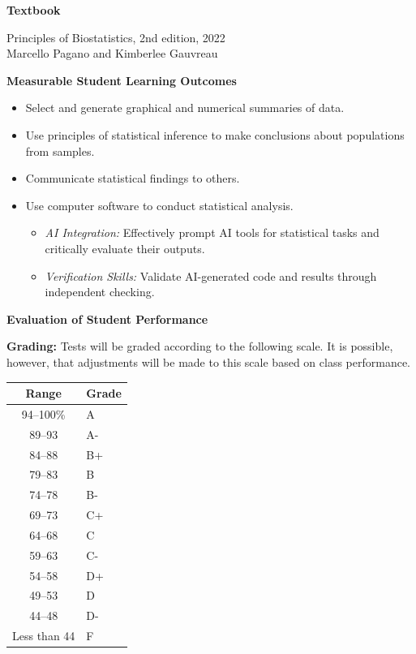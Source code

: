 \documentclass[11pt]{article}
\begin{document}
\vspace{8pt}

\newpage

\noindent\textbf{Textbook}

\noindent Principles of Biostatistics, 2nd edition, 2022\\
Marcello Pagano and Kimberlee Gauvreau

\vspace{8pt}

\noindent\textbf{Measurable Student Learning Outcomes}

\begin{itemize}[leftmargin=20pt]
\item Select and generate graphical and numerical summaries of data.
\item Use principles of statistical inference to make conclusions about populations from samples.
\item Communicate statistical findings to others.
\item Use computer software to conduct statistical analysis.
\begin{itemize}[leftmargin=20pt,label=--]
\item \textcolor{aiblue}{\emph{AI Integration:} Effectively prompt AI tools for statistical tasks and critically evaluate their outputs.}
\item \textcolor{aiblue}{\emph{Verification Skills:} Validate AI-generated code and results through independent checking.}
\end{itemize}
\end{itemize}

\vspace{8pt}

\noindent\textbf{Evaluation of Student Performance}

\textbf{Grading:} Tests will be graded according to the following scale. It is possible, however, that adjustments will be made to this scale based on class performance.

\vspace{4pt}

\begin{center}
\begin{tabular}{cl}
\toprule
Range & Grade \\
\midrule
94--100\% & A \\
89--93 & A- \\
84--88 & B+ \\
79--83 & B \\
74--78 & B- \\
69--73 & C+ \\
64--68 & C \\
59--63 & C- \\
54--58 & D+ \\
49--53 & D \\
44--48 & D- \\
Less than 44 & F \\
\bottomrule
\end{tabular}
\end{center}
\end{document}
